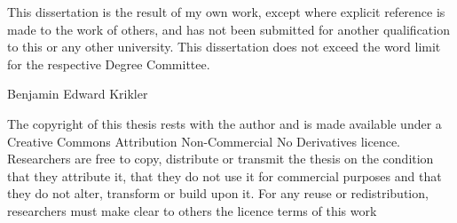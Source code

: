 \begin{declaration}
  This dissertation is the result of my own work, except where explicit
  reference is made to the work of others, and has not been submitted
  for another qualification to this or any other university. This
  dissertation does not exceed the word limit for the respective Degree
  Committee.
  \vspace*{0.5cm}
  \begin{flushright}
	Benjamin Edward Krikler
  \end{flushright}
  \vspace*{3cm}
The copyright of this thesis rests with the author and is made available under
a Creative Commons Attribution Non-Commercial No Derivatives licence.  Researchers
are free to copy, distribute or transmit the thesis on the condition that they
attribute it, that they do not use it for commercial purposes and that they do not
alter, transform or build upon it. For any reuse or redistribution, researchers
must make clear to others the licence terms of this work
\end{declaration}


